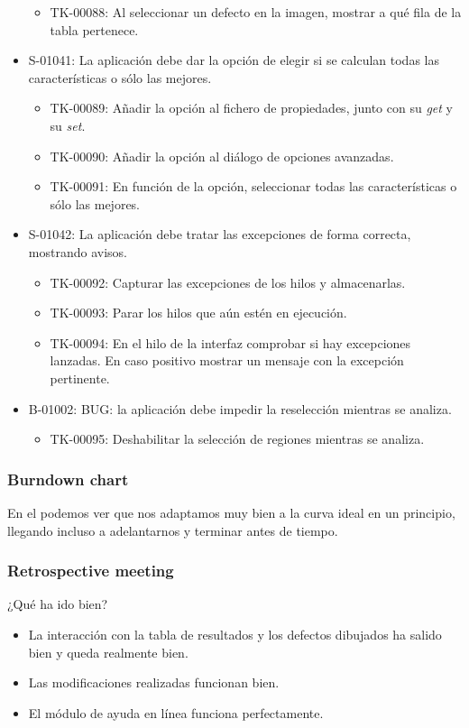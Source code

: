 \begin{itemize}
\begin{itemize}
   \item TK-00088: Al seleccionar un defecto en la imagen, mostrar a qué fila de la tabla pertenece.
  \end{itemize}
 \item S-01041: La aplicación debe dar la opción de elegir si se calculan todas las características o sólo las mejores.
  \begin{itemize}
   \item TK-00089: Añadir la opción al fichero de propiedades, junto con su \emph{get} y su \emph{set}.
   \item TK-00090: Añadir la opción al diálogo de opciones avanzadas.
   \item TK-00091: En función de la opción, seleccionar todas las características o sólo las mejores.
  \end{itemize}
 \item S-01042: La aplicación debe tratar las excepciones de forma correcta, mostrando avisos.
  \begin{itemize}
   \item TK-00092: Capturar las excepciones de los hilos y almacenarlas.
   \item TK-00093: Parar los hilos que aún estén en ejecución.
   \item TK-00094: En el hilo de la interfaz comprobar si hay excepciones lanzadas. En caso positivo mostrar un mensaje con la excepción pertinente.
  \end{itemize}
 \item B-01002: BUG: la aplicación debe impedir la reselección mientras se analiza.
  \begin{itemize}
   \item TK-00095: Deshabilitar la selección de regiones mientras se analiza.
  \end{itemize}
\end{itemize}


\subsubsection*{Burndown chart}
En el \burndownchart{}  podemos ver que nos adaptamos muy bien a la curva ideal en un principio, llegando incluso a adelantarnos y terminar antes de tiempo.



\subsubsection*{Retrospective meeting}
¿Qué ha ido bien?
\begin{itemize}
 \item La interacción con la tabla de resultados y los defectos dibujados ha salido bien y queda realmente bien.
 \item Las modificaciones realizadas funcionan bien.
 \item El módulo de ayuda en línea funciona perfectamente.
\end{itemize}

